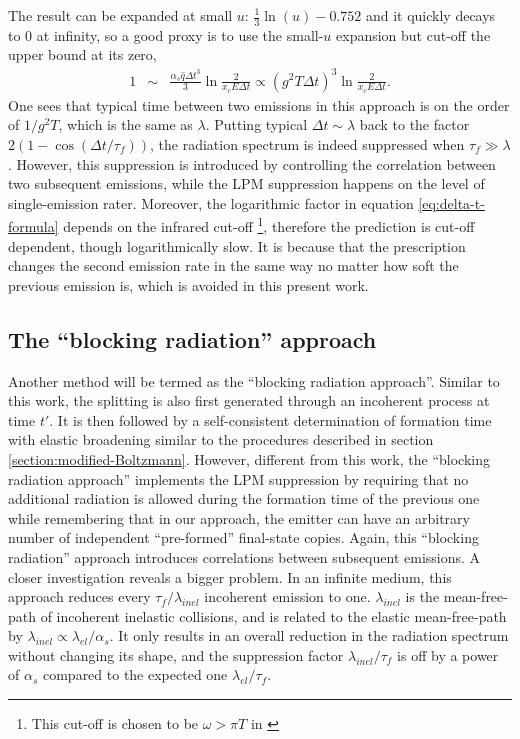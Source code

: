 \documentclass[aps, prc, reprint, amsmath, groupedaddress, nofootinbib]{revtex4-1}
\begin{document}
The result can be expanded at small $u$: $\frac{1}{3}\ln(u)-0.752$ and it quickly decays to $0$ at infinity, so a good proxy is to use the small-$u$ expansion but cut-off the upper bound at its zero,
\begin{eqnarray}
1 &\sim&  \frac{\alpha_s\hat{q}\Delta t^3}{3}\ln\frac{2}{ x_c E \Delta t } \propto (g^2 T \Delta t)^3 \ln\frac{2}{ x_c E \Delta t }.
\label{eq:delta-t-formula}
\end{eqnarray}
One sees that typical time between two emissions in this approach is on the order of $1/g^2T$, which is the same as $\lambda$.
Putting typical $\Delta t \sim \lambda$ back to the factor $2(1-\cos(\Delta t/\tau_f))$, the radiation spectrum is indeed suppressed when $\tau_f \gg \lambda$.
However, this suppression is introduced by controlling the correlation between two subsequent emissions, while the LPM suppression happens on the level of single-emission rater.
Moreover, the logarithmic factor in equation \ref{eq:delta-t-formula} depends on the infrared cut-off \footnote{This cut-off is chosen to be $\omega > \pi T$ in \cite{Cao:2013ita}}, therefore the prediction is cut-off dependent, though logarithmically slow.
It is because that the prescription changes the second emission rate in the same way no matter how soft the previous emission is, which is avoided in this present work.

\subsection{The ``blocking radiation'' approach}
Another method \cite{ColemanSmith:2012vr} will be termed as the ``blocking radiation approach''.
Similar to this work, the splitting is also first generated through an incoherent process at time $t'$. 
It is then followed by a self-consistent determination of formation time with elastic broadening similar to the procedures described in section \ref{section:modified-Boltzmann}.
However, different from this work, the ``blocking radiation approach'' implements the LPM suppression by requiring that no additional radiation is allowed during the formation time of the previous one while remembering that in our approach, the emitter can have an arbitrary number of independent ``pre-formed'' final-state copies.
Again, this ``blocking radiation'' approach introduces correlations between subsequent emissions.
A closer investigation reveals a bigger problem.
In an infinite medium, this approach reduces every $\tau_f/\lambda_{inel}$ incoherent emission to one. 
$\lambda_{inel}$ is the mean-free-path of incoherent inelastic collisions, and is related to the elastic mean-free-path by $\lambda_{inel}\propto \lambda_{el}/\alpha_s$. 
It only results in an overall reduction in the radiation spectrum without changing its shape, and the suppression factor $\lambda_{inel}/\tau_f$ is off by a power of $\alpha_s$ compared to the expected one $\lambda_{el}/\tau_f$.
\end{document}
